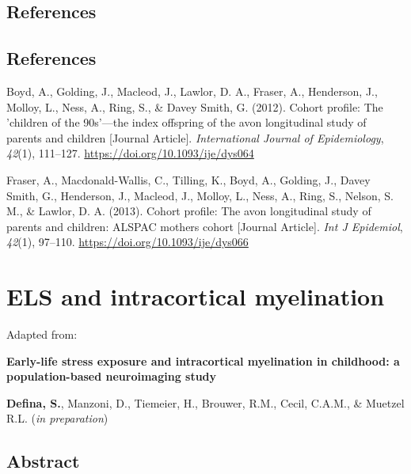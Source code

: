 \documentclass[
  letterpaper,
  DIV=11,
  numbers=noendperiod]{scrreport}
\newlength{\cslhangindent}
\newenvironment{CSLReferences}[2] %
 {\begin{list}{}{%
  \setlength{\itemindent}{0pt}
  \setlength{\leftmargin}{0pt}
  \setlength{\parsep}{0pt}
  \ifodd #1
   \setlength{\leftmargin}{\cslhangindent}
   \setlength{\itemindent}{-1\cslhangindent}
  \fi
  \setlength{\itemsep}{#2\baselineskip}}}
 {\end{list}}
\begin{document}
\section*{References}\label{references-2}


\section*{References}\label{bibliography--3}

\label{refs--3}
\begin{CSLReferences}{1}{0}
Boyd, A., Golding, J., Macleod, J., Lawlor, D. A., Fraser, A.,
Henderson, J., Molloy, L., Ness, A., Ring, S., \& Davey Smith, G.
(2012). Cohort profile: The 'children of the 90s'---the index offspring
of the avon longitudinal study of parents and children {[}Journal
Article{]}. \emph{International Journal of Epidemiology}, \emph{42}(1),
111--127. \url{https://doi.org/10.1093/ije/dys064}

Fraser, A., Macdonald-Wallis, C., Tilling, K., Boyd, A., Golding, J.,
Davey Smith, G., Henderson, J., Macleod, J., Molloy, L., Ness, A., Ring,
S., Nelson, S. M., \& Lawlor, D. A. (2013). Cohort profile: The avon
longitudinal study of parents and children: ALSPAC mothers cohort
{[}Journal Article{]}. \emph{Int J Epidemiol}, \emph{42}(1), 97--110.
\url{https://doi.org/10.1093/ije/dys066}

\end{CSLReferences}

\chapter{ELS and intracortical myelination}\label{sec-chapter4}

Adapted from:

\textbf{Early-life stress exposure and intracortical myelination in
childhood: a population-based neuroimaging study}

\textbf{Defina, S.}, Manzoni, D., Tiemeier, H., Brouwer, R.M., Cecil,
C.A.M., \& Muetzel R.L. (\emph{in preparation})

\section*{Abstract}\label{abstract-2}
\end{document}
